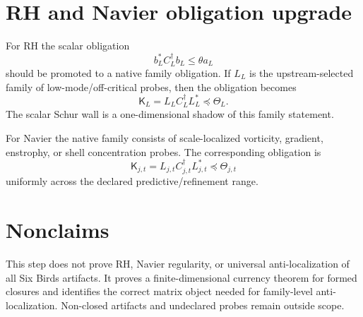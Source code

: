 \documentclass[11pt]{article}
\begin{document}
\section{RH and Navier obligation upgrade}
For RH the scalar obligation
\[
        b_L^*C_L^\dagger b_L\le\theta a_L
\]
should be promoted to a native family obligation.  If $L_L$ is the upstream-selected family of low-mode/off-critical probes, then the obligation becomes
\[
        \boxed{\mathsf K_L=L_L C_L^\dagger L_L^*\preceq\Theta_L.}
\]
The scalar Schur wall is a one-dimensional shadow of this family statement.

For Navier the native family consists of scale-localized vorticity, gradient, enstrophy, or shell concentration probes.  The corresponding obligation is
\[
        \boxed{\mathsf K_{j,t}=L_{j,t}C_{j,t}^\dagger L_{j,t}^*\preceq\Theta_{j,t}}
\]
uniformly across the declared predictive/refinement range.

\section{Nonclaims}
This step does not prove RH, Navier regularity, or universal anti-localization of all Six Birds artifacts.  It proves a finite-dimensional currency theorem for formed closures and identifies the correct matrix object needed for family-level anti-localization.  Non-closed artifacts and undeclared probes remain outside scope.
\end{document}
